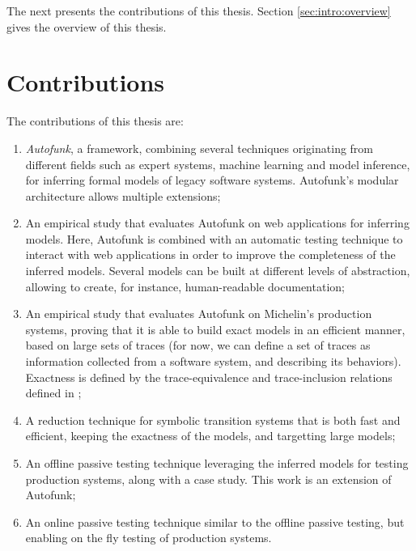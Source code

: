 
The next presents the contributions of this thesis. Section
\ref{sec:intro:overview} gives the overview of this thesis.


\section{Contributions}
\label{sec:intro:contrib}

The contributions of this thesis are:

\begin{enumerate}
    \item \textit{Autofunk}, a framework, combining several
        techniques originating from different fields such as
        expert systems, machine learning and model inference, for
        inferring formal models of legacy software systems.
        Autofunk's modular architecture allows multiple
        extensions;

    \item An empirical study that evaluates Autofunk on web
        applications for inferring models. Here, Autofunk is
        combined with an automatic testing technique to interact
        with web applications in order to improve the
        completeness of the inferred models. Several models can
        be built at different levels of abstraction, allowing to
        create, for instance, human-readable documentation;

    \item An empirical study that evaluates Autofunk on
        Michelin's production systems, proving that it is able to
        build exact models in an efficient manner, based on large
        sets of traces (for now, we can define a set of traces as
        information collected from a software system, and
        describing its behaviors). Exactness is defined by the
        trace-equivalence and trace-inclusion relations defined
        in \cite{petrenko06};

    \item A reduction technique for symbolic transition systems
        that is both fast and efficient, keeping the exactness of
        the models, and targetting large models;

    \item An offline passive testing technique leveraging the
        inferred models for testing production systems, along
        with a case study. This work is an extension of Autofunk;

    \item An online passive testing technique similar to the
        offline passive testing, but enabling on the fly testing
        of production systems.
\end{enumerate}

